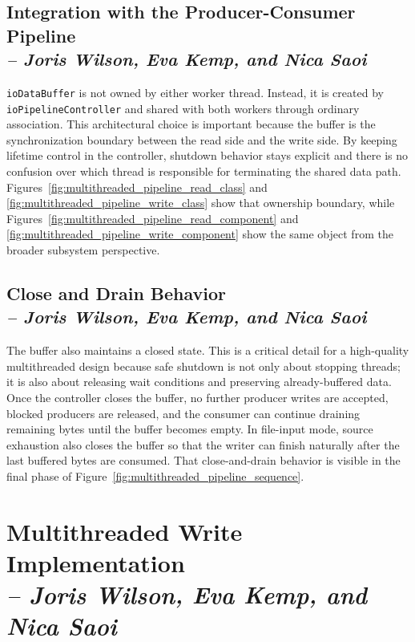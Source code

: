 \subsection{Integration with the Producer-Consumer Pipeline \\
\small{\textit{-- Joris Wilson, Eva Kemp, and Nica Saoi}}}
\label{Section::Integration with the Producer-Consumer Pipeline}

\texttt{ioDataBuffer} is not owned by either worker thread. Instead, it is created by \texttt{ioPipelineController} and shared with both workers through ordinary association. This architectural choice is important because the buffer is the synchronization boundary between the read side and the write side. By keeping lifetime control in the controller, shutdown behavior stays explicit and there is no confusion over which thread is responsible for terminating the shared data path. Figures~\ref{fig:multithreaded_pipeline_read_class} and \ref{fig:multithreaded_pipeline_write_class} show that ownership boundary, while Figures~\ref{fig:multithreaded_pipeline_read_component} and \ref{fig:multithreaded_pipeline_write_component} show the same object from the broader subsystem perspective.

\subsection{Close and Drain Behavior \\
\small{\textit{-- Joris Wilson, Eva Kemp, and Nica Saoi}}}
\label{Section::Close and Drain Behavior}

The buffer also maintains a closed state. This is a critical detail for a high-quality multithreaded design because safe shutdown is not only about stopping threads; it is also about releasing wait conditions and preserving already-buffered data. Once the controller closes the buffer, no further producer writes are accepted, blocked producers are released, and the consumer can continue draining remaining bytes until the buffer becomes empty. In file-input mode, source exhaustion also closes the buffer so that the writer can finish naturally after the last buffered bytes are consumed. That close-and-drain behavior is visible in the final phase of Figure~\ref{fig:multithreaded_pipeline_sequence}.

\section{Multithreaded Write Implementation \\
\small{\textit{-- Joris Wilson, Eva Kemp, and Nica Saoi}}}
\label{Section::Multithreaded Write Implementation}

